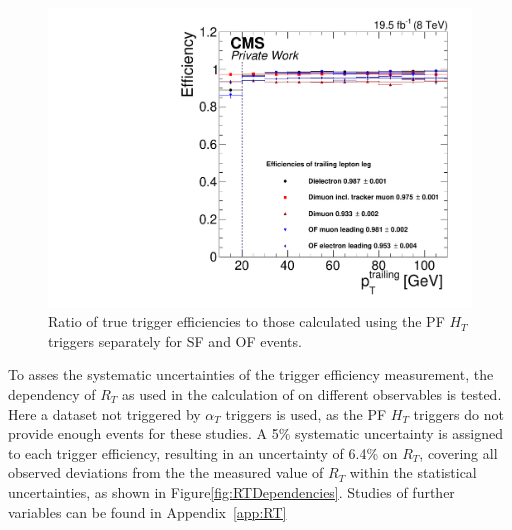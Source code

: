 \begin{figure}
\begin{center}
\includegraphics[scale=0.35]{plots/BG/trigger/Triggereff_SingleLepton_HighHTExclusive_Full2012_TrailingPt_leadingPt30Single.pdf}
\caption{Ratio of true trigger efficiencies to those calculated using the PF $H_T$ triggers separately for SF and OF events.}
\label{fig:triggerEffTrailing}
\end{center}
\end{figure} 
To asses the systematic uncertainties of the trigger efficiency measurement, the dependency of $R_T$ as used in the calculation of \Rsfof on different observables is tested. Here a dataset not triggered by $\alpha_T$ triggers is used, as the PF $H_T$ triggers do not provide enough events for these studies. A 5\% systematic uncertainty is assigned to each trigger efficiency, resulting in an uncertainty of 6.4\% on $R_T$, covering all observed deviations from the the measured value of $R_T$ within the statistical uncertainties, as shown in Figure\ref{fig:RTDependencies}. Studies of further variables can be found in Appendix~\ref{app:RT}
